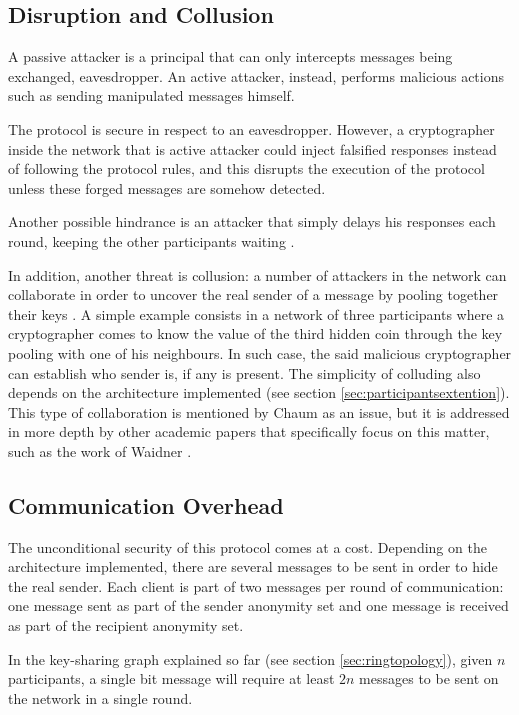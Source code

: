 \subsection{Disruption and Collusion} \label{sec:disruptionlimitation}
A passive attacker is a principal that can only intercepts messages being exchanged, eavesdropper. An active attacker, instead, performs malicious actions such as sending manipulated messages himself.

The protocol is secure in respect to an eavesdropper. However, a cryptographer inside the network that is active attacker could inject falsified responses instead of following the protocol rules, and this disrupts the execution of the protocol unless these forged messages are somehow detected. 

Another possible hindrance is an attacker that simply delays his responses each round, keeping the other participants waiting \cite{Fischer}.

In addition, another threat is collusion: a number of attackers in the network can collaborate in order to uncover the real sender of a message by pooling together their keys \cite{Chaum}. A simple example consists in a network of three participants where a cryptographer comes to know the value of the third hidden coin through the key pooling with one of his neighbours. In such case, the said malicious cryptographer can establish who sender is, if any is present. The simplicity of colluding also depends on the architecture implemented (see section \ref{sec:participantsextention}). This type of collaboration is mentioned by Chaum as an issue, but it is addressed in more depth by other academic papers that specifically focus on this matter, such as the work of Waidner \cite{Waidner}.



\subsection{Communication Overhead} \label{sec:complexitylimitation}
The unconditional security of this protocol comes at a cost. Depending on the architecture implemented, there are several messages to be sent in order to hide the real sender. Each client is part of two messages per round of communication: one message sent as part of the sender anonymity set and one message is received as part of the recipient anonymity set.

In the key-sharing graph explained so far (see section \ref{sec:ringtopology}), given $n$ participants, a single bit message will require at least $2n$ messages to be sent on the network in a single round. 

